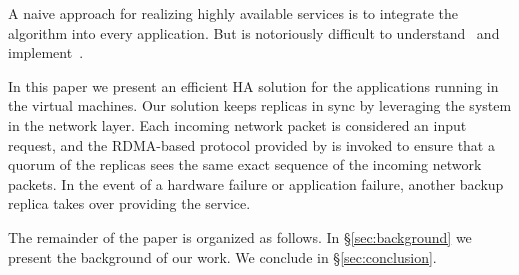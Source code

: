 A naive approach for realizing highly available services is to integrate the \paxos algorithm 
into every application. But \paxos is notoriously difficult to understand~\cite{raft:usenix14} 
and implement~\cite{paxos:practical}.

In this paper we present an efficient HA solution for the applications running in the virtual machines. 
Our solution keeps replicas in sync by leveraging the \smr system \smrsystem in the network layer. Each 
incoming network packet is considered an input request, and the RDMA-based \paxos protocol provided by 
\smrsystem is invoked to ensure that a quorum of the replicas sees the same exact sequence of the incoming 
network packets. In the event of a hardware failure or application failure, another backup replica takes 
over providing the service.

The remainder of the paper is organized as follows. In \S\ref{sec:background} we present the background 
of our work. We conclude in \S\ref{sec:conclusion}.
